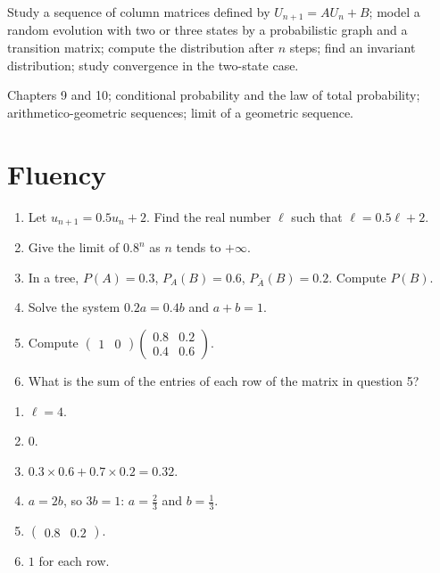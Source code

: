 
\begin{objectives}
Study a sequence of column matrices defined by $U_{n+1}=AU_n+B$; model a random evolution with two or three states by a probabilistic graph and a transition matrix; compute the distribution after $n$ steps; find an invariant distribution; study convergence in the two-state case.
\end{objectives}
\begin{prerequisites}
Chapters 9 and 10; conditional probability and the law of total probability; arithmetico-geometric sequences; limit of a geometric sequence.
\end{prerequisites}

\section{Fluency}
\begin{fluency}
\begin{enumerate}
\item Let $u_{n+1}=\num{0,5}u_n+2$. Find the real number $\ell$ such that $\ell=\num{0,5}\ell+2$.
\item Give the limit of $\num{0,8}^n$ as $n$ tends to $+\infty$.
\item In a tree, $P(A)=\num{0,3}$, $P_A(B)=\num{0,6}$, $P_{\overline A}(B)=\num{0,2}$. Compute $P(B)$.
\item Solve the system $\num{0,2}a=\num{0,4}b$ and $a+b=1$.
\item Compute $\begin{pmatrix}1&0\end{pmatrix}\begin{pmatrix}\num{0,8}&\num{0,2}\\\num{0,4}&\num{0,6}\end{pmatrix}$.
\item What is the sum of the entries of each row of the matrix in question 5?
\end{enumerate}
\end{fluency}
\begin{solution}[Fluency]
\begin{enumerate}
\item $\ell=4$.
\item $0$.
\item $\num{0,3}\times\num{0,6}+\num{0,7}\times\num{0,2}=\num{0,32}$.
\item $a=2b$, so $3b=1$: $a=\frac23$ and $b=\frac13$.
\item $\begin{pmatrix}\num{0,8}&\num{0,2}\end{pmatrix}$.
\item $1$ for each row.
\end{enumerate}
\end{solution}


